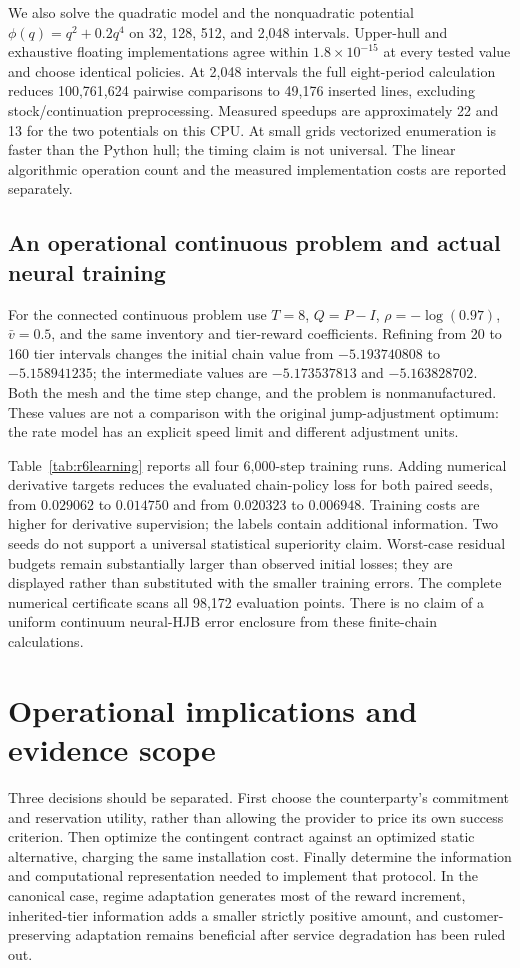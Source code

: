 We also solve the quadratic model and the nonquadratic potential $\phi(q)=q^2+0.2q^4$ on 32, 128, 512, and 2,048 intervals. Upper-hull and exhaustive floating implementations agree within $1.8\times10^{-15}$ at every tested value and choose identical policies. At 2,048 intervals the full eight-period calculation reduces 100,761,624 pairwise comparisons to 49,176 inserted lines, excluding stock/continuation preprocessing. Measured speedups are approximately 22 and 13 for the two potentials on this CPU. At small grids vectorized enumeration is faster than the Python hull; the timing claim is not universal. The linear algorithmic operation count and the measured implementation costs are reported separately.

\subsection{An operational continuous problem and actual neural training}
For the connected continuous problem use $T=8$, $Q=P-I$, $\rho=-\log(0.97)$, $\bar v=0.5$, and the same inventory and tier-reward coefficients. Refining from 20 to 160 tier intervals changes the initial chain value from $-5.193740808$ to $-5.158941235$; the intermediate values are $-5.173537813$ and $-5.163828702$. Both the mesh and the time step change, and the problem is nonmanufactured. These values are not a comparison with the original jump-adjustment optimum: the rate model has an explicit speed limit and different adjustment units.

Table~\ref{tab:r6learning} reports all four 6,000-step training runs. Adding numerical derivative targets reduces the evaluated chain-policy loss for both paired seeds, from $0.029062$ to $0.014750$ and from $0.020323$ to $0.006948$. Training costs are higher for derivative supervision; the labels contain additional information. Two seeds do not support a universal statistical superiority claim. Worst-case residual budgets remain substantially larger than observed initial losses; they are displayed rather than substituted with the smaller training errors. The complete numerical certificate scans all 98,172 evaluation points. There is no claim of a uniform continuum neural-HJB error enclosure from these finite-chain calculations.


\section{Operational implications and evidence scope}
Three decisions should be separated. First choose the counterparty's commitment and reservation utility, rather than allowing the provider to price its own success criterion. Then optimize the contingent contract against an optimized static alternative, charging the same installation cost. Finally determine the information and computational representation needed to implement that protocol. In the canonical case, regime adaptation generates most of the reward increment, inherited-tier information adds a smaller strictly positive amount, and customer-preserving adaptation remains beneficial after service degradation has been ruled out.

